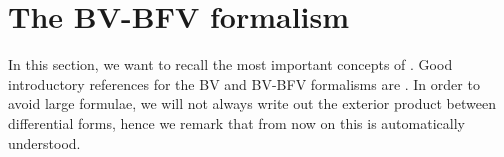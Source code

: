 \documentclass[11pt,colorinlistoftodos]{amsart}
\numberwithin{equation}{subsection}
\theoremstyle{plain}
\theoremstyle{definition}
\theoremstyle{remark}
\begin{document}
\section{The BV-BFV formalism}
\label{sec:BV-BFV_formalism}
In this section, we want to recall the most important concepts of \cite{CMR2}. Good introductory references for the BV and BV-BFV formalisms are \cite{Cost,Mnev2019,CattMosh1}. In order to avoid large formulae, we will not always write out the exterior product between differential forms, hence we remark that from now on this is automatically understood.
\end{document}
